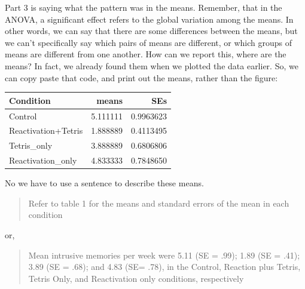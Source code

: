 \documentclass[]{book}
\newenvironment{Shaded}{\begin{snugshade}}{\end{snugshade}}
\newcommand{\KeywordTok}[1]{\textcolor[rgb]{0.13,0.29,0.53}{\textbf{#1}}}
\newcommand{\DataTypeTok}[1]{\textcolor[rgb]{0.13,0.29,0.53}{#1}}
\newcommand{\StringTok}[1]{\textcolor[rgb]{0.31,0.60,0.02}{#1}}
\newcommand{\CommentTok}[1]{\textcolor[rgb]{0.56,0.35,0.01}{\textit{#1}}}
\newcommand{\OperatorTok}[1]{\textcolor[rgb]{0.81,0.36,0.00}{\textbf{#1}}}
\newcommand{\NormalTok}[1]{#1}
\begin{document}
Part 3 is saying what the pattern was in the means. Remember, that in
the ANOVA, a significant effect refers to the global variation among the
means. In other words, we can say that there are some differences
between the means, but we can't specifically say which pairs of means
are different, or which groups of means are different from one another.
How can we report this, where are the means? In fact, we already found
them when we plotted the data earlier. So, we can copy paste that code,
and print out the means, rather than the figure:

\begin{Shaded}
\end{Shaded}

\begin{tabular}{l|r|r}
\hline
Condition & means & SEs\\
\hline
Control & 5.111111 & 0.9963623\\
\hline
Reactivation+Tetris & 1.888889 & 0.4113495\\
\hline
Tetris\_only & 3.888889 & 0.6806806\\
\hline
Reactivation\_only & 4.833333 & 0.7848650\\
\hline
\end{tabular}

No we have to use a sentence to describe these means.

\begin{quote}
Refer to table 1 for the means and standard errors of the mean in each
condition
\end{quote}

or,

\begin{quote}
Mean intrusive memories per week were 5.11 (SE = .99); 1.89 (SE = .41);
3.89 (SE = .68); and 4.83 (SE= .78), in the Control, Reaction plus
Tetris, Tetris Only, and Reactivation only conditions, respectively
\end{quote}
\end{document}
